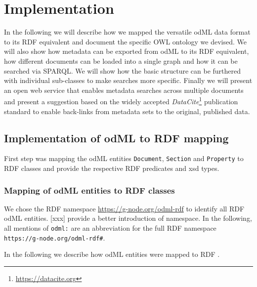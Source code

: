 \documentclass{article}
\begin{document}
\section{Implementation} \label{sec:implementation}

In the following we will describe how we mapped the versatile odML data format to its RDF equivalent and document the specific OWL ontology we devised. We will also show how metadata can be exported from odML to its RDF equivalent, how different documents can be loaded into a single graph and how it can be searched via SPARQL. We will show how the basic structure can be furthered with individual sub-classes to make searches more specific. Finally we will present an open web service that enables metadata searches across multiple documents and present a suggestion based on the widely accepted \textit{DataCite}\footnote{\url{https://datacite.org}} publication standard to enable back-links from metadata sets to the original, published data.

\subsection{Implementation of odML to RDF mapping} \label{sec::odml_rdf}

First step was mapping the odML entities \texttt{Document}, \texttt{Section} and \texttt{Property} to RDF classes and provide the respective RDF predicates and xsd types.

\subsubsection{Mapping of odML entities to RDF classes} \label{sec:odml_rdf_mapping}

We chose the RDF namespace \url{https://g-node.org/odml-rdf} to identify all RDF odML entities. [xxx] provide a better introduction of namespace.
In the following, all mentions of \texttt{odml:} are an abbreviation for the full RDF namespace \texttt{https://g-node.org/odml-rdf#}.

In the following we describe how odML entities were mapped to RDF .
\end{document}

